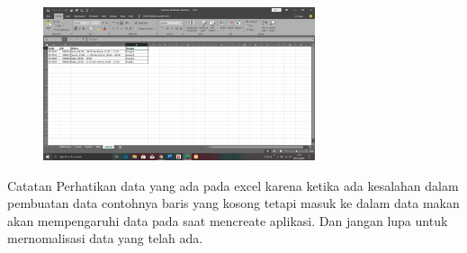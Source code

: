 \documentclass{article}
\begin{document}
\begin{enumerate}
\begin{figure} [h]
\end{figure}
\begin{figure} [h]
\newpage \centerline{\includegraphics[width=8cm]{figure/58.png}}
\end{figure}

\newpage \par Catatan Perhatikan data yang ada pada excel karena ketika ada kesalahan dalam pembuatan data contohnya baris yang kosong tetapi masuk ke dalam data makan akan mempengaruhi data pada saat mencreate aplikasi. Dan jangan lupa untuk mernomalisasi data yang telah ada.


\end{enumerate}
\end{document}
